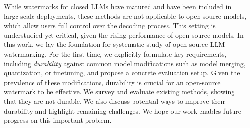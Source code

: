 \vspace{-0.1in}
While watermarks for closed LLMs have matured and have been included in large-scale deployments, these methods are not applicable to open-source models, which allow users full control over the decoding process. 
This setting is understudied yet critical, given the rising performance of open-source models.
In this work, we lay the foundation for systematic study of open-source LLM watermarking.
For the first time, we explicitly formulate key requirements, including \emph{durability} against common model modifications such as model merging, quantization, or finetuning, and propose a concrete evaluation setup. 
Given the prevalence of these modifications, durability is crucial for an open-source watermark to be effective.
We survey and evaluate existing methods, showing that they are not durable.  
We also discuss potential ways to improve their durability and highlight remaining challenges.  
We hope our work enables future progress on this important problem. 
